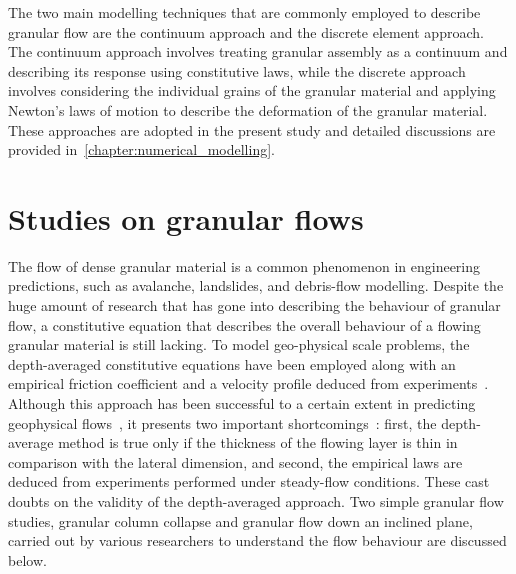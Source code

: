 The two main modelling techniques that are commonly employed to describe 
granular flow are the continuum approach and the discrete element approach. The 
continuum approach involves treating granular assembly as a continuum and 
describing its response using constitutive laws, while the discrete approach 
involves considering the individual grains of the granular material and 
applying Newton's laws of motion to describe the deformation of the granular 
material. These approaches are adopted in the present study and detailed 
discussions are provided in~\cref{chapter:numerical_modelling}. 

\section{Studies on granular flows}
The flow of dense granular material is a common phenomenon in engineering 
predictions, such as avalanche, landslides, and debris-flow modelling. Despite 
the huge amount of research that has gone into describing the behaviour of 
granular flow, a constitutive equation that describes the overall behaviour of 
a flowing granular material is still lacking. To model geo-physical scale 
problems, the depth-averaged constitutive equations have been employed along 
with an empirical friction coefficient and a velocity profile deduced from 
experiments~\citep{Midi2004,Iverson2003,Pouliquen1999}. Although this approach 
has been successful to a certain extent in predicting geophysical 
flows~\citep{Pouliquen2002a, Hutter1995}, it presents two important 
shortcomings~\citep{Lajeunesse2005}: first, the depth-average method is true 
only if the thickness of the flowing layer is thin in comparison with the 
lateral dimension, and second, the empirical laws are deduced from experiments 
performed under steady-flow conditions. These cast doubts on the validity of 
the depth-averaged approach. Two simple granular flow studies, granular column 
collapse and granular flow down an inclined plane, carried out by 
various researchers to understand the flow behaviour are discussed below.


